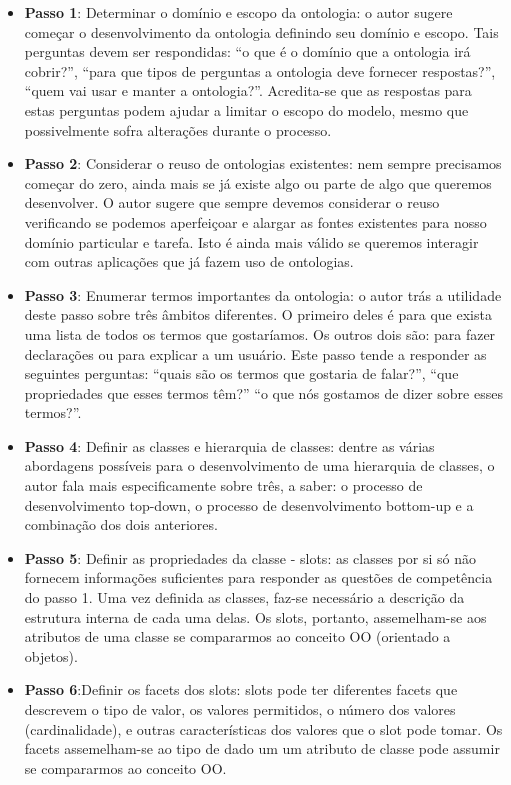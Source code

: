 \begin{itemize}
 	\item \textbf{Passo 1}: Determinar o domínio e escopo da ontologia: o autor sugere começar o desenvolvimento da ontologia definindo seu domínio e escopo. Tais perguntas devem ser respondidas: “o que é o domínio que a ontologia irá cobrir?”, “para que tipos de perguntas a ontologia deve fornecer respostas?”, “quem vai usar e manter a ontologia?”. Acredita-se que as respostas para estas perguntas podem ajudar a limitar o escopo do modelo, mesmo que possivelmente sofra alterações durante o processo.
 	\item \textbf{Passo 2}: Considerar o reuso de ontologias existentes: nem sempre precisamos começar do zero, ainda mais se já existe algo ou parte de algo que queremos desenvolver. O autor sugere que sempre devemos considerar o reuso verificando se podemos aperfeiçoar e alargar as fontes existentes para nosso domínio particular e tarefa. Isto é ainda mais válido se queremos interagir com outras aplicações que já fazem uso de ontologias.
	\item \textbf{Passo 3}: Enumerar termos importantes da ontologia: o autor trás a utilidade deste passo sobre três âmbitos diferentes. O primeiro deles é para que exista uma lista de todos os termos que gostaríamos. Os outros dois são: para fazer declarações ou para explicar a um usuário. Este passo tende a responder as seguintes perguntas: “quais são os termos que gostaria de falar?”, “que propriedades que esses termos têm?” “o que nós gostamos de dizer sobre esses termos?”.
	\item \textbf{Passo 4}: Definir as classes e hierarquia de classes: dentre as várias abordagens possíveis para o desenvolvimento de uma hierarquia de classes, o autor fala mais especificamente sobre três, a saber: o processo de desenvolvimento top-down, o processo de desenvolvimento bottom-up e a combinação dos dois anteriores.
	\item \textbf{Passo 5}: Definir as propriedades da classe - slots: as classes por si só não fornecem informações suficientes para responder as questões de competência do passo 1. Uma vez definida as classes, faz-se necessário a descrição da estrutura interna de cada uma delas. Os slots, portanto, assemelham-se aos atributos de uma classe se compararmos ao conceito OO (orientado a objetos).
	\item \textbf{Passo 6}:Definir os facets dos slots: slots pode ter diferentes facets que descrevem o tipo de valor, os valores permitidos, o número dos valores (cardinalidade), e outras características dos valores que o slot pode tomar. Os facets assemelham-se ao tipo de dado um um atributo de classe pode assumir se compararmos ao conceito OO.

\end{itemize}
